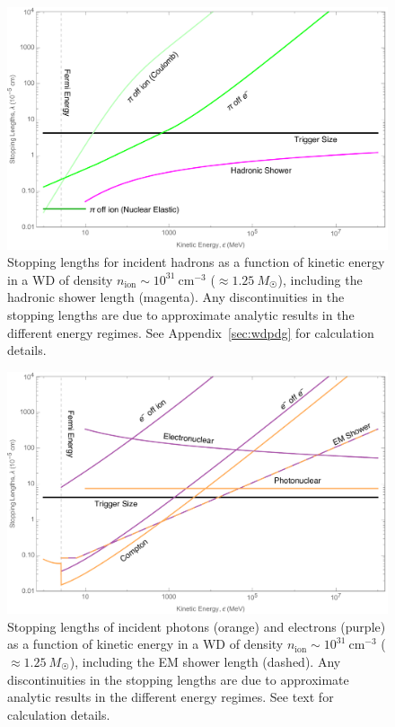 \begin{figure}
\includegraphics[scale=.3]{SPhighHad.pdf}
\caption{Stopping lengths for incident hadrons as a function of kinetic energy in a WD of density $n_\text{ion} \sim 10^{31}~\text{cm}^{-3}$ ($\approx 1.25 ~M_{\astrosun}$), including the hadronic shower length (magenta).
Any discontinuities in the stopping lengths are due to approximate analytic results in the different energy regimes.
See Appendix~\ref{sec:wdpdg} for calculation details.
}
\label{fig:SPhighHad}
\end{figure}

\begin{figure}
\includegraphics[scale=.3]{SPhighEM.pdf}
\caption{Stopping lengths of incident photons (orange) and electrons (purple) as a function of kinetic energy in a WD of density $n_\text{ion} \sim 10^{31}~\text{cm}^{-3}$ ($\approx 1.25 ~M_{\astrosun}$), including the EM shower length (dashed).
Any discontinuities in the stopping lengths are due to approximate analytic results in the different energy regimes.
See text for calculation details.
}
\label{fig:SPhighEM}
\end{figure}


